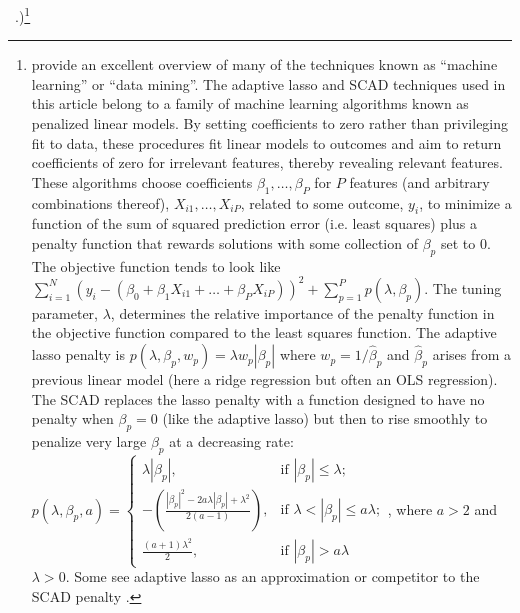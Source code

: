 \documentclass[12pt]{article}
\begin{document}
~\citep{hainmueller2012kernel}.)\footnote{\citet{hasttibfried09} provide an
  excellent overview of many of the techniques known as ``machine learning''
  or ``data mining''. The adaptive lasso and SCAD techniques used in this
  article belong to a family of machine learning algorithms known as penalized
  linear models. By setting coefficients to zero rather than privileging fit
  to data,  these procedures fit linear models to outcomes and aim to return
  coefficients of zero for irrelevant features, thereby revealing relevant
  features. These algorithms choose coefficients $\beta_1, \ldots, \beta_P$
  for $P$ features (and arbitrary combinations thereof), $X_{i1}, \ldots,
  X_{iP}$, related to some outcome, $y_i$, to minimize a function of the sum
  of squared prediction error (i.e. least squares) plus a penalty function
  that rewards solutions with some collection of $\beta_p$ set to 0. The
  objective function tends to look like $\sum_{i=1}^N (y_i - ( \beta_0 +
  \beta_1 X_{i1} + \ldots + \beta_P X_{iP}) )^2 + \sum_{p=1}^P
  p(\lambda,\beta_p)$.  The tuning parameter, $\lambda$, determines the
  relative importance of the penalty function in the objective function
  compared to the least squares function.  The adaptive lasso penalty is
  $p(\lambda,\beta_p,w_p)=\lambda  w_p|\beta_p|$ where $w_p=1/\hat{\beta}_p$
  and $\hat{\beta}_p$ arises from a previous linear model (here a ridge
  regression but often an OLS regression). The SCAD replaces the lasso penalty
  with a function designed to have no penalty when $\beta_p=0$ (like the
  adaptive lasso) but then to rise smoothly to penalize very large $\beta_p$
  at a decreasing rate:  $p(\lambda,\beta_p,a)=\begin{cases} \lambda
    |\beta_p|, & \text{if } |\beta_p|\le \lambda; \\ - \left(
      \frac{|\beta_p|^2 - 2 a \lambda |\beta_p| + \lambda^2}{2 (a-1)} \right),
    & \text{if } \lambda < |\beta_p| \le a \lambda; \\
    \frac{(a+1)\lambda^2}{2},  & \text{if } |\beta_p| > a \lambda
  \end{cases}$, where $a > 2$ and $\lambda > 0$.  Some see adaptive lasso as
  an approximation or competitor to the SCAD penalty \cite[page
  92]{hasttibfried09}. }
 
\end{document}
